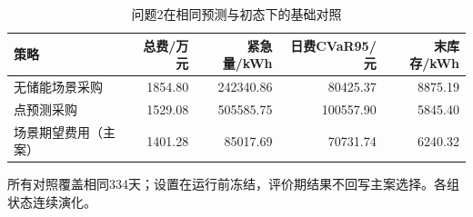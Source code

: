 \begin{table}[htbp]\centering\small
\caption{问题2在相同预测与初态下的基础对照}
\label{tab:v2_baselines}
\begin{tabularx}{\linewidth}{LRRRR}\toprule
策略 & 总费/万元 & 紧急量/kWh & 日费CVaR95/元 & 末库存/kWh\\\midrule
无储能场景采购 & 1854.80 & 242340.86 & 80425.37 & 8875.19\\
点预测采购 & 1529.08 & 505585.75 & 100557.90 & 5845.40\\
场景期望费用（主案） & 1401.28 & 85017.69 & 70731.74 & 6240.32\\
\bottomrule\end{tabularx}
\par\smallskip\parbox{\linewidth}{\footnotesize 所有对照覆盖相同334天；设置在运行前冻结，评价期结果不回写主案选择。各组状态连续演化。}
\end{table}